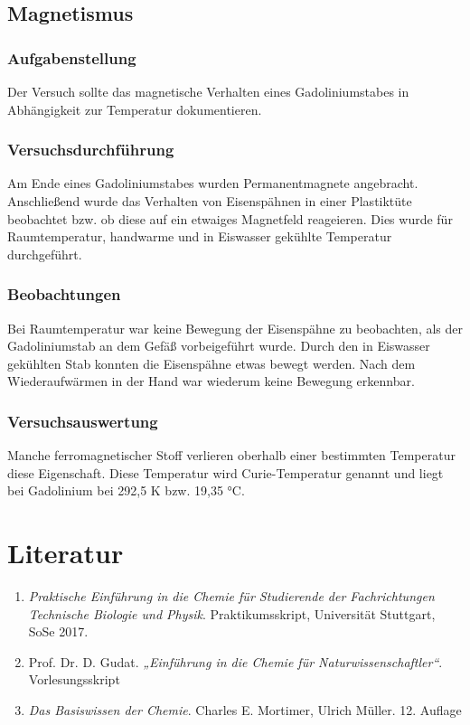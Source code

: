 \documentclass{scrartcl}
\begin{document}
\subsection{Magnetismus}
\subsubsection{Aufgabenstellung}
Der Versuch sollte das magnetische Verhalten eines Gadoliniumstabes in Abhängigkeit zur Temperatur dokumentieren.

\subsubsection{Versuchsdurchführung}
Am Ende eines Gadoliniumstabes wurden Permanentmagnete angebracht. Anschließend wurde das Verhalten von Eisenspähnen in einer Plastiktüte beobachtet bzw. ob diese auf ein etwaiges Magnetfeld reageieren. Dies wurde für Raumtemperatur, handwarme und in Eiswasser gekühlte Temperatur durchgeführt.

\subsubsection{Beobachtungen}
Bei Raumtemperatur war keine Bewegung der Eisenspähne zu beobachten, als der Gadoliniumstab an dem Gefäß vorbeigeführt wurde. Durch den in Eiswasser gekühlten Stab konnten die Eisenspähne etwas bewegt werden. Nach dem Wiederaufwärmen in der Hand war wiederum keine Bewegung erkennbar.
\subsubsection{Versuchsauswertung}
Manche ferromagnetischer Stoff verlieren oberhalb einer bestimmten Temperatur diese Eigenschaft. Diese Temperatur wird Curie-Temperatur genannt und liegt bei Gadolinium bei 292,5 K bzw. 19,35 °C.
 
 
\section{Literatur}
\begin{enumerate}[label=(\arabic*)]
	\item \emph{Praktische Einführung in die Chemie
für Studierende der Fachrichtungen
Technische Biologie und Physik}. Praktikumsskript, Universität Stuttgart,
SoSe 2017.  
	\item Prof. Dr. D. Gudat. \emph{„Einführung in die Chemie für Naturwissenschaftler“}. Vorlesungsskript
	\item \emph{Das Basiswissen der Chemie}. Charles E. Mortimer, Ulrich Müller. 12. Auflage
\end{enumerate}
\end{document}
